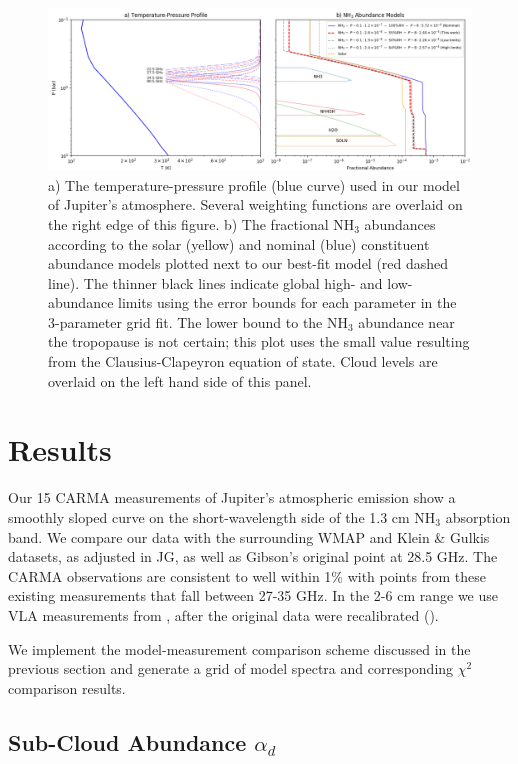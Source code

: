 \documentclass{article}
\begin{document}
	\begin{figure}
		\centering
		\includegraphics[width=\textwidth]{final_tp_const.png}
		\caption{\label{fig:tp}a) The temperature-pressure profile (blue curve) used in our model of Jupiter's atmosphere. Several weighting functions are overlaid on the right edge of this figure. b) The fractional NH$_{3}$ abundances according to the solar (yellow) and nominal (blue) constituent abundance models plotted next to our best-fit model (red dashed line). The thinner black lines indicate global high- and low-abundance limits using the error bounds for each parameter in the 3-parameter grid fit. The lower bound to the NH$_{3}$ abundance near the tropopause is not certain; this plot uses the small value resulting from the Clausius-Clapeyron equation of state. Cloud levels are overlaid on the left hand side of this panel.}
	\end{figure}


\section{Results} \label{s:results}

	Our 15 CARMA measurements of Jupiter's atmospheric emission show a smoothly sloped curve on the short-wavelength side of the 1.3 cm NH$_{3}$ absorption band.
	We compare our data with the surrounding WMAP and Klein \& Gulkis datasets, as adjusted in JG, as well as Gibson's original point at 28.5 GHz. The CARMA observations are consistent to well within 1\% with points from these existing measurements that fall between 27-35 GHz. In the 2-6 cm range we use VLA measurements from \citealt{2016Sci...352.1198D}, after the original data were recalibrated (\citealt{2016AGUFM.P31D..08D}).
	

	We implement the model-measurement comparison scheme discussed in the previous section and generate a grid of model spectra and corresponding $\chi^{2}$ comparison results.

\subsection{Sub-Cloud Abundance $\alpha_{d}$}
\end{document}

